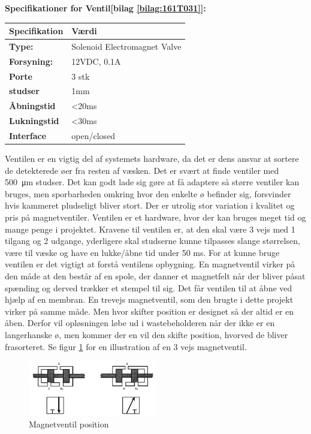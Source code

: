 \textbf{Specifikationer for Ventil[bilag \ref{bilag:161T031}]:} 
\begin{center}
		\begin{longtable}{ | m{6.5cm} | m{6.5cm}| } 
			\hline
			\textbf{Specifikation} &\textbf{Værdi} \\ 
			\hline
			\textbf{Type:} & Solenoid Electromagnet Valve \\ 
			\hline
			\textbf{Forsyning:} & 12VDC, 0.1A  \\ 
			\hline
			\textbf{Porte} & 3 stk \\ 
			\hline		
			\textbf{studser} & 1mm  \\ 
			\hline	
			\textbf{Åbningstid} & <20ms  \\ 
			\hline	
			\textbf{Lukningstid} & <30ms  \\ 
			\hline	
			\textbf{Interface} & open/closed  \\ 
			\hline	
		\end{longtable}
\end{center}
Ventilen er en vigtig del af systemets hardware, da det er dens ansvar at sortere de detekterede øer fra resten af væsken. Det er svært at finde ventiler med \SI{500}{\micro\metre} studser. Det kan godt lade sig gøre at få adaptere så større ventiler kan bruges, men sporbarheden omkring hvor den enkelte ø befinder sig, forsvinder hvis kammeret pludseligt bliver stort. Der er utrolig stor variation i kvalitet og pris på magnetventiler. Ventilen er et hardware, hvor der kan bruges meget tid og mange penge i projektet.
Kravene til ventilen er, at den skal være 3 vejs med 1 tilgang og 2 udgange, yderligere skal studserne kunne tilpasses slange størrelsen, være til væske og have en lukke/åbne tid under 50 ms.
For at kunne bruge ventilen er det vigtigt at forstå ventilens opbygning. 
 En magnetventil virker på den måde at den består af en spole, der danner et magnetfelt når der bliver påsat spænding og derved trækker et stempel til sig. Det får ventilen til at åbne ved hjælp af en membran. En trevejs magnetventil, som den brugte i dette projekt virker på samme måde. Men hvor skifter position er designet så der altid er en åben. Derfor vil opløsningen løbe ud i wastebeholderen når der ikke er en langerhanske ø, men kommer der en vil den skifte position, hvorved de bliver frasorteret. Se figur \ref{fig:ventilpos} for en illustration af en 3 vejs magnetventil.

\begin{figure}[H]
	\centering
	\includegraphics[width=0.5\textwidth]{billeder/Hardware/ventil.png}
	\caption{Magnetventil position}
	\label{fig:ventilpos}
\end{figure}  

